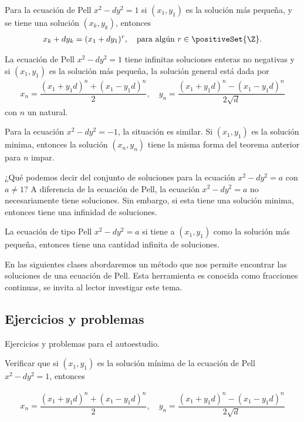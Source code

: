 \begin{theorem.box}{}{}
    Para la ecuación de Pell $x^2 - dy^2 = 1$ si $(x_1, y_1)$ es la solución más pequeña, y se tiene una solución $(x_k, y_k)$, entonces
    \begin{align*}
        x_k + d y_k = (x_1 + dy_1)^r, \quad \text{para algún}\ r\in \positiveSet{\Z}.
    \end{align*}
\end{theorem.box}

\begin{theorem.box}{}{}
    La ecuación de Pell $x^2 - dy^2 = 1$ tiene infinitas soluciones enteras no negativas y si $(x_1, y_1)$ es la solución más pequeña,
    la solución general está dada por
    \begin{align*}
        x_n = \dfrac{(x_1 + y_1 d)^n + (x_1 - y_1 d)^n}{2}, \quad
        y_n = \dfrac{(x_1 + y_1 d)^n - (x_1 - y_1 d)^n}{2\sqrt{d}}
    \end{align*}
    con $n$ un natural.
\end{theorem.box}

Para la ecuación $x^2 - dy^2 = -1$, la situación es similar.
Si $(x_1, y_1)$ es la solución minima, entonces la solución $(x_n, y_n)$ tiene la misma forma del teorema anterior para $n$ impar.

¿Qué podemos decir del conjunto de soluciones para la ecuación $x^2 - dy^2 = a$ con $a \neq 1$?
A diferencia de la ecuación de Pell, la ecuación $x^2 - dy^2 = a$ no necesariamente tiene soluciones.
Sin embargo, si esta tiene una solución minima, entonces tiene una infinidad de soluciones.

\begin{theorem.box}{}{}
    La ecuación de tipo Pell $x^2 - dy^2 = a$ si tiene a $(x_1, y_1)$ como la solución más pequeña,
    entonces tiene una cantidad infinita de soluciones.
\end{theorem.box}

En las siguientes clases abordaremos un método que nos permite encontrar las soluciones de una ecuación de Pell.
Esta herramienta es conocida como fracciones continuas, se invita al lector investigar este tema.

\subsection{Ejercicios y problemas}
Ejercicios y problemas para el autoestudio.

\begin{exercise}
    Verificar que si $(x_1, y_1)$ es la solución mínima de la ecuación de Pell $x^2 - dy^2 = 1$, entonces

    \begin{align*}
        x_n = \dfrac{(x_1 + y_1 d)^n + (x_1 - y_1 d)^n}{2}, \quad
        y_n = \dfrac{(x_1 + y_1 d)^n - (x_1 - y_1 d)^n}{2\sqrt{d}}
    \end{align*}
\end{exercise}

